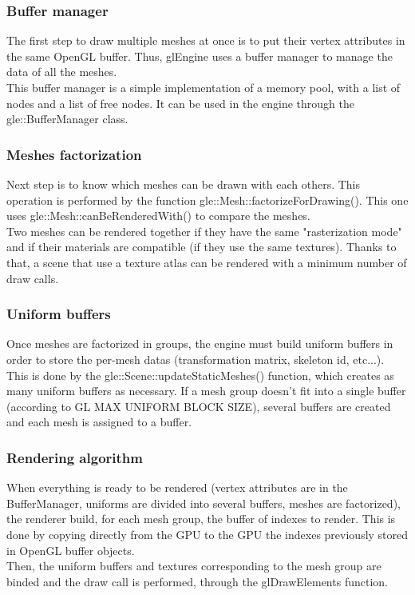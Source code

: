 \documentclass [a4 paper,11pt]{report}
\begin{document}
\subsubsection{Buffer manager}
The first step to draw multiple meshes at once is to put their vertex attributes in the same OpenGL buffer. Thus, glEngine uses a buffer manager to manage the data of all the meshes.\\
This buffer manager is a simple implementation of a memory pool, with a list of nodes and a list of free nodes. It can be used in the engine through the gle::BufferManager class.

\subsubsection{Meshes factorization}
Next step is to know which meshes can be drawn with each others. This operation is performed by the function gle::Mesh::factorizeForDrawing(). This one uses gle::Mesh::canBeRenderedWith() to compare the meshes.\\
Two meshes can be rendered together if they have the same "rasterization mode" and if their materials are compatible (if they use the same textures). Thanks to that, a scene that use a texture atlas can be rendered with a minimum number of draw calls.

\subsubsection{Uniform buffers}
Once meshes are factorized in groups, the engine must build uniform buffers in order to store the per-mesh datas (transformation matrix, skeleton id, etc...). This is done by the gle::Scene::updateStaticMeshes() function, which creates as many uniform buffers as necessary. If a mesh group doesn't fit into a single buffer (according to GL MAX UNIFORM BLOCK SIZE), several buffers are created and each mesh is assigned to a buffer.

\subsubsection{Rendering algorithm}
When everything is ready to be rendered (vertex attributes are in the BufferManager, uniforms are divided into several buffers, meshes are factorized), the renderer build, for each mesh group, the buffer of indexes to render. This is done by copying directly from the GPU to the GPU the indexes previously stored in OpenGL buffer objects.\\
Then, the uniform buffers and textures corresponding to the mesh group are binded and the draw call is performed, through the glDrawElements function.
\end{document}
